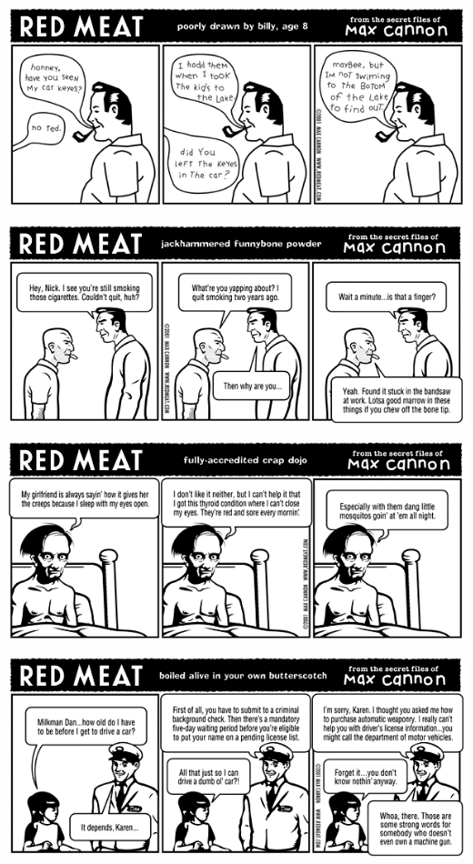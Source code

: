 \documentclass[a4paper,twoside,11pt]{article}
\begin{document}
\includegraphics[width=\textwidth]{redmeat_2001-05-15.png}



\includegraphics[width=\textwidth]{redmeat_2001-05-22.png}



\includegraphics[width=\textwidth]{redmeat_2001-05-29.png}



\includegraphics[width=\textwidth]{redmeat_2001-06-05.png}
\end{document}
